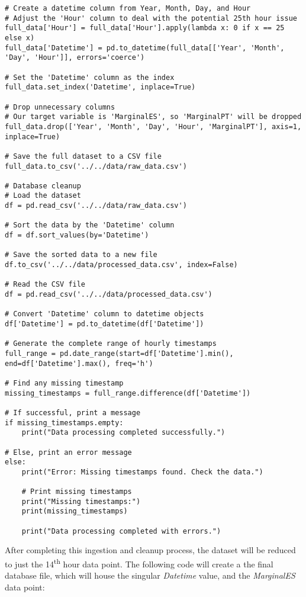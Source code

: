 \documentclass[12pt]{report} %
\begin{document}
\begin{lstlisting}
# Create a datetime column from Year, Month, Day, and Hour
# Adjust the 'Hour' column to deal with the potential 25th hour issue 
full_data['Hour'] = full_data['Hour'].apply(lambda x: 0 if x == 25 else x)
full_data['Datetime'] = pd.to_datetime(full_data[['Year', 'Month', 'Day', 'Hour']], errors='coerce')

# Set the 'Datetime' column as the index
full_data.set_index('Datetime', inplace=True)

# Drop unnecessary columns
# Our target variable is 'MarginalES', so 'MarginalPT' will be dropped
full_data.drop(['Year', 'Month', 'Day', 'Hour', 'MarginalPT'], axis=1, inplace=True)

# Save the full dataset to a CSV file
full_data.to_csv('../../data/raw_data.csv')

# Database cleanup
# Load the dataset
df = pd.read_csv('../../data/raw_data.csv')

# Sort the data by the 'Datetime' column
df = df.sort_values(by='Datetime')

# Save the sorted data to a new file
df.to_csv('../../data/processed_data.csv', index=False)

# Read the CSV file
df = pd.read_csv('../../data/processed_data.csv')

# Convert 'Datetime' column to datetime objects
df['Datetime'] = pd.to_datetime(df['Datetime'])

# Generate the complete range of hourly timestamps
full_range = pd.date_range(start=df['Datetime'].min(), end=df['Datetime'].max(), freq='h')

# Find any missing timestamp
missing_timestamps = full_range.difference(df['Datetime'])

# If successful, print a message
if missing_timestamps.empty:
    print("Data processing completed successfully.")

# Else, print an error message
else:
    print("Error: Missing timestamps found. Check the data.")

    # Print missing timestamps
    print("Missing timestamps:")
    print(missing_timestamps)

    print("Data processing completed with errors.")
\end{lstlisting}

After completing this ingestion and cleanup process, the dataset will be reduced to just the 14\textsuperscript{th} hour data point. The following code will create a the final database file, which will house the singular \textit{Datetime} value, and the \textit{MarginalES} data point:
\end{document}
